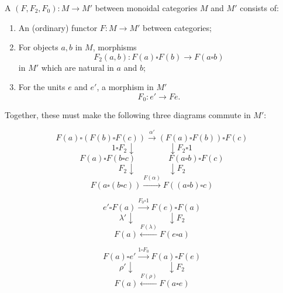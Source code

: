 A  $(F, F_2, F_0) : M \rightarrow M'$ between monoidal categories $M$ and $M'$ consists of:

\begin{enumerate}
\item[(i)] An (ordinary) functor $F : M \rightarrow M'$ between categories;
\item[(ii)] For objects $a, b$ in $M$, morphisms
$$F_2(a, b) : F(a) \square F(b) \rightarrow F(a \square b)$$
in $M'$ which are natural in $a$ and $b$;
\item[(iii)] For the units $e$ and $e'$, a morphism in $M'$
$$F_0 : e' \rightarrow Fe.$$
\end{enumerate}

Together, these must make the following three diagrams commute in $M'$:

$$F(a) \square (F(b) \square F(c)) \xrightarrow{\alpha'} (F(a) \square F(b)) \square F(c)$$
$$1 \square F_2 \downarrow \qquad \qquad \downarrow F_2 \square 1$$
$$F(a) \square F(b \square c) \qquad \qquad F(a \square b) \square F(c)$$
$$F_2 \downarrow \qquad \qquad \downarrow F_2$$
$$F(a \square (b \square c)) \xrightarrow{F(\alpha)} F((a \square b) \square c)$$

$$e' \square F(a) \xrightarrow{F_0 \square 1} F(e) \square F(a)$$
$$\lambda' \downarrow \qquad \qquad \downarrow F_2$$
$$F(a) \xleftarrow{F(\lambda)} F(e \square a)$$

$$F(a) \square e' \xrightarrow{1 \square F_0} F(a) \square F(e)$$
$$\rho' \downarrow \qquad \qquad \downarrow F_2$$
$$F(a) \xleftarrow{F(\rho)} F(a \square e)$$
